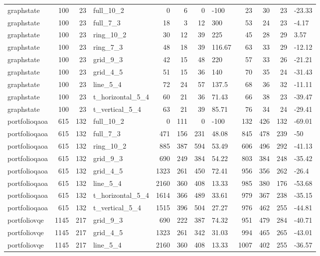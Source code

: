 \begin{longtable}{lrrlrrrlrrrl}
graphstate & 100 & 23 & full\_10\_2 & 0 & 6 & 0 & -100 & 23 & 30 & 23 & -23.33 \\
graphstate & 100 & 23 & full\_7\_3 & 18 & 3 & 12 & 300 & 53 & 24 & 23 & -4.17 \\
graphstate & 100 & 23 & ring\_10\_2 & 30 & 12 & 39 & 225 & 45 & 28 & 29 & 3.57 \\
graphstate & 100 & 23 & ring\_7\_3 & 48 & 18 & 39 & 116.67 & 63 & 33 & 29 & -12.12 \\
graphstate & 100 & 23 & grid\_9\_3 & 42 & 15 & 48 & 220 & 57 & 33 & 26 & -21.21 \\
graphstate & 100 & 23 & grid\_4\_5 & 51 & 15 & 36 & 140 & 70 & 35 & 24 & -31.43 \\
graphstate & 100 & 23 & line\_5\_4 & 72 & 24 & 57 & 137.5 & 68 & 36 & 32 & -11.11 \\
graphstate & 100 & 23 & t\_horizontal\_5\_4 & 60 & 21 & 36 & 71.43 & 66 & 38 & 23 & -39.47 \\
graphstate & 100 & 23 & t\_vertical\_5\_4 & 63 & 21 & 39 & 85.71 & 76 & 34 & 24 & -29.41 \\
portfolioqaoa & 615 & 132 & full\_10\_2 & 0 & 111 & 0 & -100 & 132 & 426 & 132 & -69.01 \\
portfolioqaoa & 615 & 132 & full\_7\_3 & 471 & 156 & 231 & 48.08 & 845 & 478 & 239 & -50 \\
portfolioqaoa & 615 & 132 & ring\_10\_2 & 885 & 387 & 594 & 53.49 & 606 & 496 & 292 & -41.13 \\
portfolioqaoa & 615 & 132 & grid\_9\_3 & 690 & 249 & 384 & 54.22 & 803 & 384 & 248 & -35.42 \\
portfolioqaoa & 615 & 132 & grid\_4\_5 & 1323 & 261 & 450 & 72.41 & 956 & 356 & 262 & -26.4 \\
portfolioqaoa & 615 & 132 & line\_5\_4 & 2160 & 360 & 408 & 13.33 & 985 & 380 & 176 & -53.68 \\
portfolioqaoa & 615 & 132 & t\_horizontal\_5\_4 & 1614 & 366 & 489 & 33.61 & 979 & 367 & 238 & -35.15 \\
portfolioqaoa & 615 & 132 & t\_vertical\_5\_4 & 1515 & 396 & 504 & 27.27 & 976 & 462 & 255 & -44.81 \\
portfoliovqe & 1145 & 217 & grid\_9\_3 & 690 & 222 & 387 & 74.32 & 951 & 479 & 284 & -40.71 \\
portfoliovqe & 1145 & 217 & grid\_4\_5 & 1323 & 261 & 342 & 31.03 & 994 & 465 & 265 & -43.01 \\
portfoliovqe & 1145 & 217 & line\_5\_4 & 2160 & 360 & 408 & 13.33 & 1007 & 402 & 255 & -36.57 \\

\end{longtable}
